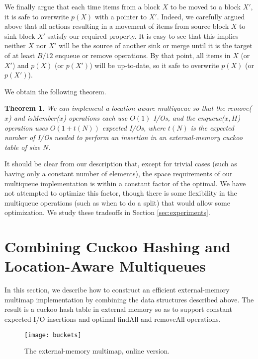\documentclass[11pt,letterpaper]{article}
\newtheorem{theorem}{Theorem}
\begin{document}
We finally argue that each time items from a block
$X$ to be moved to a block $X'$,
it is safe to overwrite $p(X)$ with a pointer to $X'$. Indeed, we carefully argued above that all actions resulting in a movement of items from source block $X$ to sink block $X'$ satisfy our required property. It is easy to see that this implies neither $X$ nor $X'$ will be the source of another sink or merge until it is the target of at least $B/12$ enqueue or remove operations. By that point, all items in $X$ (or $X'$) and $p(X)$ (or $p(X')$) will be up-to-date, so it safe to overwrite $p(X)$ (or $p(X')$).



We obtain the following theorem.

\begin{theorem} \label{thm:multiqueue}
We can implement a location-aware multiqueue so that 
the remove($x$) and isMember($x$)
operations each use $O(1)$ I/Os,
and the enqueue($x,H$) operation uses $O(1+t(N))$ expected I/Os,
where $t(N)$ is the expected number of I/Os needed to perform an
insertion in an external-memory cuckoo table of size $N$.
\end{theorem}

It should be clear from our description that, except for trivial cases
(such as having only a constant number of elements), the space
requirements of our multiqueue implementation is within a constant
factor of the optimal.  We have not attempted to optimize this factor, though
there is some flexibility in the multiqueue operations (such as when to do a split)
that would allow some optimization.
We study these tradeoffs in Section \ref{sec:experiments}.



\section{Combining Cuckoo Hashing and Location-Aware Multiqueues}
\label{sec:combine}
In this section, we describe how to construct an efficient
external-memory multimap implementation by combining the 
data structures described above.
The result is 
a cuckoo hash table in external memory so as to support constant
expected-I/O insertions and optimal findAll and removeAll
operations.

\begin{figure*}[!thb]
\begin{center}
\texttt{[image: buckets]}
\caption{The external-memory multimap, online version.}
\label{fig:buckets}
\end{center}
\end{figure*}
\end{document}
